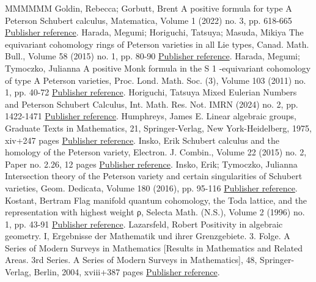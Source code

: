 \documentclass[11pt]{article}
\theoremstyle{definition}
\numberwithin{equation}{section}
\numberwithin{equation}{section}
\begin{document}
\begin{thebibliography}{MMMMMM}
 Goldin, Rebecca; Gorbutt, Brent A positive formula for type A Peterson Schubert calculus, Matematica, Volume 1 (2022) no. 3, pp. 618-665 \href{https://alco.centre-mersenne.org/articles/10.5802/alco.342/#GoGo}{Publisher reference}.
 Harada, Megumi; Horiguchi, Tatsuya; Masuda, Mikiya The equivariant cohomology rings of Peterson varieties in all Lie types, Canad. Math. Bull., Volume 58 (2015) no. 1, pp. 80-90 \href{https://alco.centre-mersenne.org/articles/10.5802/alco.342/#ha-ho-ma}{Publisher reference}.
 Harada, Megumi; Tymoczko, Julianna A positive Monk formula in the S 1 -equivariant cohomology of type A Peterson varieties, Proc. Lond. Math. Soc. (3), Volume 103 (2011) no. 1, pp. 40-72 \href{https://alco.centre-mersenne.org/articles/10.5802/alco.342/#HaTy}{Publisher reference}.
 Horiguchi, Tatsuya Mixed Eulerian Numbers and Peterson Schubert Calculus, Int. Math. Res. Not. IMRN (2024) no. 2, pp. 1422-1471 \href{https://alco.centre-mersenne.org/articles/10.5802/alco.342/#Horiguchi21}{Publisher reference}.
 Humphreys, James E. Linear algebraic groups, Graduate Texts in Mathematics, 21, Springer-Verlag, New York-Heidelberg, 1975, xiv+247 pages \href{https://alco.centre-mersenne.org/articles/10.5802/alco.342/#Humphreys}{Publisher reference}.
 Insko, Erik Schubert calculus and the homology of the Peterson variety, Electron. J. Combin., Volume 22 (2015) no. 2, Paper no. 2.26, 12 pages \href{https://alco.centre-mersenne.org/articles/10.5802/alco.342/#Insko}{Publisher reference}.
 Insko, Erik; Tymoczko, Julianna Intersection theory of the Peterson variety and certain singularities of Schubert varieties, Geom. Dedicata, Volume 180 (2016), pp. 95-116 \href{https://alco.centre-mersenne.org/articles/10.5802/alco.342/#Insko-Tymoczko}{Publisher reference}.
 Kostant, Bertram Flag manifold quantum cohomology, the Toda lattice, and the representation with highest weight ρ, Selecta Math. (N.S.), Volume 2 (1996) no. 1, pp. 43-91 \href{https://alco.centre-mersenne.org/articles/10.5802/alco.342/#Kostant}{Publisher reference}.
 Lazarsfeld, Robert Positivity in algebraic geometry. I, Ergebnisse der Mathematik und ihrer Grenzgebiete. 3. Folge. A Series of Modern Surveys in Mathematics [Results in Mathematics and Related Areas. 3rd Series. A Series of Modern Surveys in Mathematics], 48, Springer-Verlag, Berlin, 2004, xviii+387 pages \href{https://alco.centre-mersenne.org/articles/10.5802/alco.342/#Lazarsfeld}{Publisher reference}.

\end{thebibliography}
\end{document}
